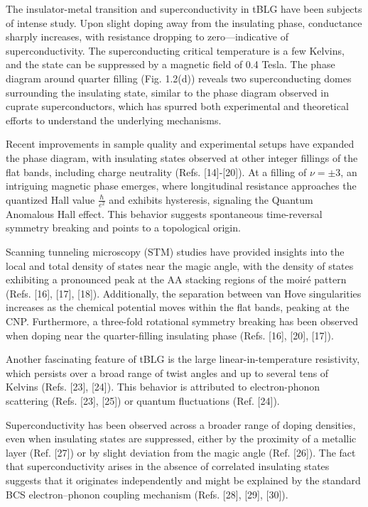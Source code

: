 The insulator-metal transition and superconductivity in tBLG have been subjects of intense study. Upon slight doping away from the insulating phase, conductance sharply increases, with resistance dropping to zero—indicative of superconductivity. The superconducting critical temperature is a few Kelvins, and the state can be suppressed by a magnetic field of 0.4 Tesla. The phase diagram around quarter filling (Fig. 1.2(d)) reveals two superconducting domes surrounding the insulating state, similar to the phase diagram observed in cuprate superconductors, which has spurred both experimental and theoretical efforts to understand the underlying mechanisms.

Recent improvements in sample quality and experimental setups have expanded the phase diagram, with insulating states observed at other integer fillings of the flat bands, including charge neutrality (Refs. [14]-[20]). At a filling of \(\nu = \pm 3\), an intriguing magnetic phase emerges, where longitudinal resistance approaches the quantized Hall value \(\frac{\hbar}{e^2}\) and exhibits hysteresis, signaling the Quantum Anomalous Hall effect. This behavior suggests spontaneous time-reversal symmetry breaking and points to a topological origin.

Scanning tunneling microscopy (STM) studies have provided insights into the local and total density of states near the magic angle, with the density of states exhibiting a pronounced peak at the AA stacking regions of the moiré pattern (Refs. [16], [17], [18]). Additionally, the separation between van Hove singularities increases as the chemical potential moves within the flat bands, peaking at the CNP. Furthermore, a three-fold rotational symmetry breaking has been observed when doping near the quarter-filling insulating phase (Refs. [16], [20], [17]).

Another fascinating feature of tBLG is the large linear-in-temperature resistivity, which persists over a broad range of twist angles and up to several tens of Kelvins (Refs. [23], [24]). This behavior is attributed to electron-phonon scattering (Refs. [23], [25]) or quantum fluctuations (Ref. [24]).

Superconductivity has been observed across a broader range of doping densities, even when insulating states are suppressed, either by the proximity of a metallic layer (Ref. [27]) or by slight deviation from the magic angle (Ref. [26]). The fact that superconductivity arises in the absence of correlated insulating states suggests that it originates independently and might be explained by the standard BCS electron–phonon coupling mechanism (Refs. [28], [29], [30]).

